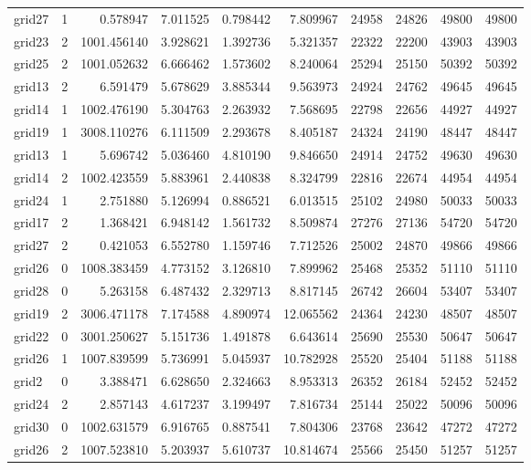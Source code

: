 \begin{longtable}{|l|r|r|r|r|r|r|r|r|r|}
grid27 & 1 & 0.578947 & 7.011525 & 0.798442 & 7.809967 & 24958 & 24826 & 49800 & 49800 \\
grid23 & 2 & 1001.456140 & 3.928621 & 1.392736 & 5.321357 & 22322 & 22200 & 43903 & 43903 \\
grid25 & 2 & 1001.052632 & 6.666462 & 1.573602 & 8.240064 & 25294 & 25150 & 50392 & 50392 \\
grid13 & 2 & 6.591479 & 5.678629 & 3.885344 & 9.563973 & 24924 & 24762 & 49645 & 49645 \\
grid14 & 1 & 1002.476190 & 5.304763 & 2.263932 & 7.568695 & 22798 & 22656 & 44927 & 44927 \\
grid19 & 1 & 3008.110276 & 6.111509 & 2.293678 & 8.405187 & 24324 & 24190 & 48447 & 48447 \\
grid13 & 1 & 5.696742 & 5.036460 & 4.810190 & 9.846650 & 24914 & 24752 & 49630 & 49630 \\
grid14 & 2 & 1002.423559 & 5.883961 & 2.440838 & 8.324799 & 22816 & 22674 & 44954 & 44954 \\
grid24 & 1 & 2.751880 & 5.126994 & 0.886521 & 6.013515 & 25102 & 24980 & 50033 & 50033 \\
grid17 & 2 & 1.368421 & 6.948142 & 1.561732 & 8.509874 & 27276 & 27136 & 54720 & 54720 \\
grid27 & 2 & 0.421053 & 6.552780 & 1.159746 & 7.712526 & 25002 & 24870 & 49866 & 49866 \\
grid26 & 0 & 1008.383459 & 4.773152 & 3.126810 & 7.899962 & 25468 & 25352 & 51110 & 51110 \\
grid28 & 0 & 5.263158 & 6.487432 & 2.329713 & 8.817145 & 26742 & 26604 & 53407 & 53407 \\
grid19 & 2 & 3006.471178 & 7.174588 & 4.890974 & 12.065562 & 24364 & 24230 & 48507 & 48507 \\
grid22 & 0 & 3001.250627 & 5.151736 & 1.491878 & 6.643614 & 25690 & 25530 & 50647 & 50647 \\
grid26 & 1 & 1007.839599 & 5.736991 & 5.045937 & 10.782928 & 25520 & 25404 & 51188 & 51188 \\
grid2 & 0 & 3.388471 & 6.628650 & 2.324663 & 8.953313 & 26352 & 26184 & 52452 & 52452 \\
grid24 & 2 & 2.857143 & 4.617237 & 3.199497 & 7.816734 & 25144 & 25022 & 50096 & 50096 \\
grid30 & 0 & 1002.631579 & 6.916765 & 0.887541 & 7.804306 & 23768 & 23642 & 47272 & 47272 \\
grid26 & 2 & 1007.523810 & 5.203937 & 5.610737 & 10.814674 & 25566 & 25450 & 51257 & 51257 \\

\end{longtable}
